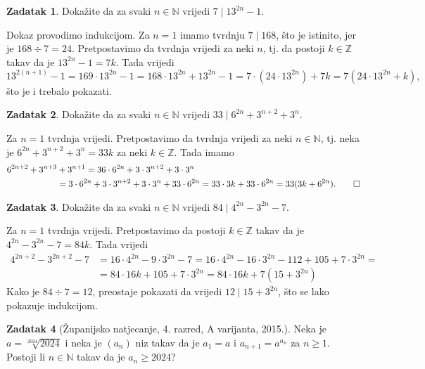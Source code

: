 \documentclass{book}
\renewenvironment{proof}{%
    \vspace{-\parskip}\begin{oldproof}%
    }{%
    \end{oldproof}%
}
\theoremstyle{definition}
\theoremstyle{definition}
\newtheorem{exercise}{Zadatak}
\theoremstyle{remark}
\begin{document}
\begin{exercise}
Dokažite da za svaki $n\in \mathbb{N}$ vrijedi $7 \; |\; 13^{2n}-1$.
\end{exercise}
\begin{proof}[Rješenje]
Dokaz provodimo indukcijom. Za $n=1$ imamo tvrdnju $7 \; |\; 168$, što je istinito, jer je $168 \div 7=24$. Pretpostavimo da tvrdnja vrijedi za neki $n$, tj. da postoji $k\in \mathbb{Z}$ takav da je $13^{2n}-1=7k$. Tada vrijedi
$$13^{2(n+1)}-1=169\cdot 13^{2n}-1=168\cdot 13^{2n}+13^{2n}-1=7\cdot (24\cdot 13^{2n})+7k=7(24\cdot 13^{2n}+k),$$
što je i trebalo pokazati.
\end{proof}
\begin{exercise}
Dokažite da za svaki $n\in \mathbb{N}$ vrijedi $33\; |\; 6^{2n}+3^{n+2}+3^n$.
\end{exercise}
\begin{proof}[Rješenje]
Za $n=1$ tvrdnja vrijedi. Pretpostavimo da tvrdnja vrijedi za neki $n\in \mathbb{N}$, tj. neka je $6^{2n}+3^{n+2}+3^n=33k$ za neki $k\in \mathbb{Z}$. Tada imamo
\begin{align*}
6^{2n+2}+3^{n+3}&+3^{n+1}=36\cdot 6^{2n}+3\cdot 3^{n+2}+3\cdot 3^n\\
&=3\cdot 6^{2n}+3\cdot 3^{n+2}+3\cdot 3^n+33\cdot 6^{2n}=33\cdot 3k+33\cdot 6^{2n}=33(3k+6^{2n}).\qedhere
\end{align*}
\end{proof}
\begin{exercise}
Dokažite da za svaki $n\in \mathbb{N}$ vrijedi $84\; |\; 4^{2n}-3^{2n}-7$.
\end{exercise}
\begin{proof}[Rješenje]
Za $n=1$ tvrdnja vrijedi. Pretpostavimo da postoji $k\in \mathbb{Z}$ takav da je $4^{2n}-3^{2n}-7=84k$. Tada vrijedi
\begin{align*}
4^{2n+2}-3^{2n+2}-7&=16\cdot 4^{2n}-9\cdot 3^{2n}-7=16\cdot 4^{2n}-16\cdot 3^{2n}-112+105+7\cdot 3^{2n}=\\
&=84\cdot 16k+105+7\cdot 3^{2n}=84\cdot 16k+7(15+3^{2n})
\end{align*}
Kako je $84\div 7=12$, preostaje pokazati da vrijedi $12 \; |\; 15+3^{2n}$, što se lako pokazuje indukcijom.
\end{proof}
\begin{exercise}[Županijsko natjecanje, 4. razred, A varijanta, 2015.]
Neka je $a=\sqrt[2024]{2024}$ i neka je $(a_n)$ niz takav da je $a_1=a$ i $a_{n+1}=a^{a_n}$ za $n\geq 1$. Postoji li $n\in \mathbb{N}$ takav da je $a_n\geq 2024$?
\end{exercise}
\end{document}
